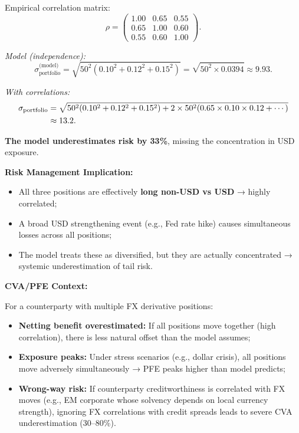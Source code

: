 Empirical correlation matrix:
\begin{equation}
	\rho = \begin{pmatrix}
		1.00 & 0.65 & 0.55 \\
		0.65 & 1.00 & 0.60 \\
		0.55 & 0.60 & 1.00
	\end{pmatrix}.
\end{equation}

\textit{Model (independence):}
\begin{equation}
	\sigma_{\text{portfolio}}^{\text{(model)}} = \sqrt{50^2(0.10^2 + 0.12^2 + 0.15^2)} = \sqrt{50^2 \times 0.0394} \approx 9.93.
\end{equation}

\textit{With correlations:}
\begin{align}
	\sigma_{\text{portfolio}} &= \sqrt{50^2(0.10^2 + 0.12^2 + 0.15^2) + 2 \times 50^2(0.65 \times 0.10 \times 0.12 + \cdots)} \notag \\
	&\approx 13.2.
\end{align}

\textbf{The model underestimates risk by 33\%}, missing the concentration in USD exposure.

\textbf{Risk Management Implication:}

\begin{itemize}
	\item All three positions are effectively \textbf{long non-USD vs USD} → highly correlated;
	\item A broad USD strengthening event (e.g., Fed rate hike) causes simultaneous losses across all positions;
	\item The model treats these as diversified, but they are actually concentrated → systemic underestimation of tail risk.
\end{itemize}

\textbf{CVA/PFE Context:}

For a counterparty with multiple FX derivative positions:
\begin{itemize}
	\item \textbf{Netting benefit overestimated:} If all positions move together (high correlation), there is less natural offset than the model assumes;
	\item \textbf{Exposure peaks:} Under stress scenarios (e.g., dollar crisis), all positions move adversely simultaneously → PFE peaks higher than model predicts;
	\item \textbf{Wrong-way risk:} If counterparty creditworthiness is correlated with FX moves (e.g., EM corporate whose solvency depends on local currency strength), ignoring FX correlations with credit spreads leads to severe CVA underestimation (30--80\%).
\end{itemize}

